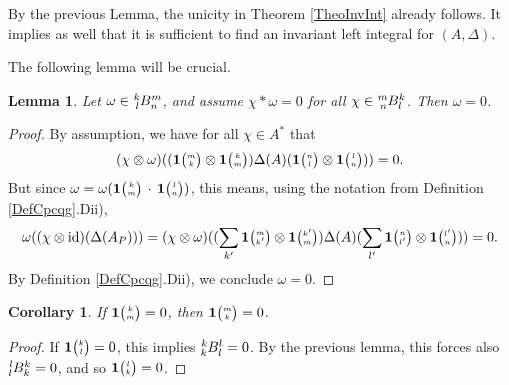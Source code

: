 \documentclass[11pt]{article}
\DeclareMathOperator{\id}{id}
\newcommand{\Grt}[3]{#1{\tiny {\begin{pmatrix} #2\\#3\end{pmatrix}}}}
\newcommand{\UnitC}[2]{\Grt{\mathbf{1}}{#1}{#2}}
\newcommand{\Gr}[5]{\tensor*[^{#2}_{#4}]{#1}{^{#3}_{#5}}}%
\newtheorem{Lem}[Theorem]{Lemma}
\newtheorem{Cor}[Theorem]{Corollary}
\theoremstyle{definition}
\numberwithin{equation}{section}
\begin{document}
By the previous Lemma, the unicity in Theorem \ref{TheoInvInt} already follows. It implies as well that it is sufficient to find an invariant left integral for $(A,\Delta)$.

The following lemma will be crucial.

\begin{Lem}\label{LemRefSep} Let $\omega \in \Gr{B}{k}{m}{l}{n}$, and assume $\chi*\omega =  0$ for all $\chi \in \Gr{B}{m}{k}{n}{l}$. Then $\omega =0$.
\end{Lem} 
\begin{proof} By assumption, we have for all $\chi\in A^*$ that \[(\chi\otimes \omega)((\UnitC{m}{k}\otimes \UnitC{k}{m})\Delta(A)(\UnitC{n}{l}\otimes \UnitC{l}{n}))=0.\] But since $\omega = \omega(\UnitC{k}{m}\,\cdot\,\UnitC{l}{n})$, this means, using the notation from Definition \ref{DefCpcqg}.Dii), \[\omega((\chi\otimes \id)(\Delta(A_P))) =(\chi\otimes \omega)((\sum_{k'}\UnitC{m}{k'}\otimes \UnitC{k'}{m})\Delta(A)(\sum_{l'}\UnitC{n}{l'}\otimes \UnitC{l'}{n})) =0.\] By Definition \ref{DefCpcqg}.Dii), we conclude $\omega=0$.
\end{proof} 

\begin{Cor} If $\UnitC{k}{m}=0$, then $\UnitC{m}{k}=0$. 
\end{Cor}
\begin{proof} If $\UnitC{k}{l}=0$, this implies $\Gr{B}{k}{l}{k}{l}=0$. By the previous lemma, this forces also $\Gr{B}{l}{k}{l}{k}=0$, and so $\UnitC{l}{k}=0$. 
\end{proof} 
\end{document}
